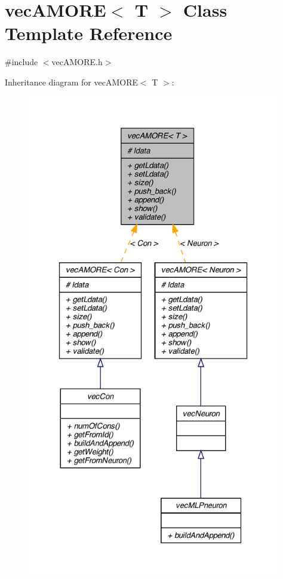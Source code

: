 \hypertarget{classvec_a_m_o_r_e}{
\section{vecAMORE$<$ T $>$ Class Template Reference}
\label{classvec_a_m_o_r_e}
}


{\ttfamily \#include $<$vecAMORE.h$>$}



Inheritance diagram for vecAMORE$<$ T $>$:
\nopagebreak
\begin{figure}[H]
\begin{center}
\leavevmode
\includegraphics[height=600pt]{classvec_a_m_o_r_e__inherit__graph}
\end{center}
\end{figure}


